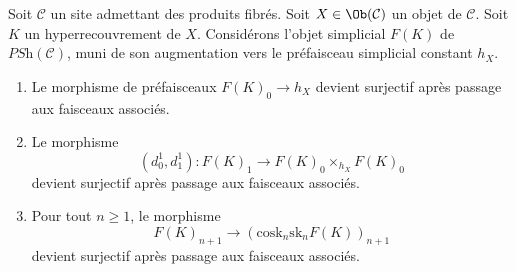 \begin{lemma}
\label{lemma-hypercovering-F}
Soit $\mathcal{C}$ un site admettant des produits fibrés.
Soit $X \in \Ob(\mathcal{C})$ un objet de $\mathcal{C}$.
Soit $K$ un hyperrecouvrement de $X$.
Considérons l'objet simplicial $F(K)$ de $\textit{PSh}(\mathcal{C})$,
muni de son augmentation vers le préfaisceau simplicial constant $h_X$.
\begin{enumerate}
\item Le morphisme de préfaisceaux $F(K)_0 \to h_X$ devient
surjectif après passage aux faisceaux associés.
\item Le morphisme
$$
(d^1_0, d^1_1) :
F(K)_1
\longrightarrow
F(K)_0 \times_{h_X} F(K)_0
$$
devient surjectif après passage aux faisceaux associés.
\item Pour tout $n \geq 1$, le morphisme
$$
F(K)_{n + 1} \longrightarrow (\text{cosk}_n \text{sk}_n F(K))_{n + 1}
$$
devient surjectif après passage aux faisceaux associés.
\end{enumerate}
\end{lemma}

